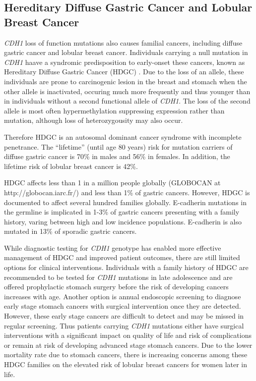 \subsection{Hereditary Diffuse Gastric Cancer and Lobular Breast Cancer}
\textit{CDH1} loss of function mutations also causes familial cancers, including diffuse gastric cancer and lobular breast cancer\cite{HDGC,Graziano2003,Guilford2010,Oliveira2009}. Individuals carrying a null mutation in \textit{CDH1} haave a syndromic predisposition to early-onset these cancers, known as Hereditary Diffuse Gastric Cancer (HDGC) \cite{Guilford1998}. Due to the loss of an allele, these individuals are prone to carcinogenic lesion in the breast and stomach when the other allele is inactivated, occuring much more frequently and thus younger than in individuals without a second functional allele of \textit{CDH1}. The loss of the second allele is most often hypermethylation suppressing expression rather than mutation, although loss of heterozygousity may also occur. 

Therefore HDGC is an autosomal dominant cancer syndrome with incomplete penetrance. The ``lifetime'' (until age 80 years) risk for mutation carriers  of diffuse gastric cancer is 70\% in males and 56\% in females. In addition, the lifetime risk of lobular breast cancer is 42\%.   

HDGC affects less than 1 in a million people globally (GLOBOCAN at http://globocan.iarc.fr/) and less than 1\% of gastric cancers. However, HDGC is documented to affect several hundred families globally. E-cadherin mutations in the germline is implicated in 1-3\% of gastric cancers presenting with a family history, varing between high and low incidence populations. E-cadherin is also mutated in 13\% of sporadic gastric cancers.

While diagnostic testing for \textit{CDH1} genotype has enabled more effective management of HDGC and improved patient outcomes, there are still limited options for clinical interventions. Individuals with a family history of HDGC are recommended to be tested for \textit{CDH1} mutations in late adolescence and are offered prophylactic stomach surgery before the risk of developing cancers increases with age. Another option is annual endoscopic screening to diagnose early stage stomach cancers with surgical intervention once they are detected. However, these early stage cancers are difficult to detect and may be missed in regular screening. Thus patients carrying \textit{CDH1} mutations either have surgical interventions with a significant impact on quality of life and risk of complications or remain at risk of developing advanced stage stomach cancers. Due to the lower mortality rate due to stomach cancers, there is increasing concerns among these HDGC families on the elevated risk of lobular breast cancers for women later in life.

